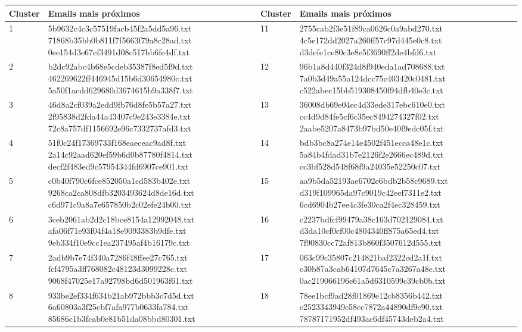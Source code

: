\documentclass[10pt,twocolumn,letterpaper]{article}
\begin{document}
\begin{table}
\begin{center}
\begin{tabular}{ | l | l || l | l | p{8cm} |}
\hline
Cluster & Emails mais próximos & Cluster & Emails mais próximos \\
\hline
1 & \parbox[c][1.5cm]{6cm}{5b9632c4c3c57519facb45f2a5dd5a96.txt 71868b35bb0b811f7f5663f79a8c28ad.txt 0ee154d3e67ef3491d08c517bb6fe4df.txt} & 11 & \parbox[c][1.5cm]{6cm}{2755cab2f3e51f89ca0626c0a9abd270.txt 4c5e172dd2027a260ff57c97d445e0c8.txt d3defe1ce80c3e8e5f3690ff2de4bfd6.txt} \\
2 & \parbox[c][1.5cm]{6cm}{b2dc92abc4b68e5cdeb35387f8ed5f9d.txt 462269622ff446945d15b6d30654980c.txt 5a50f1acdd629680d3674615b9a338f7.txt} & 12 & \parbox[c][1.5cm]{6cm}{96b1a8d440f324d8f940eda1ad708688.txt 7a0b3d49a55a124dcc75c403420c0481.txt c522abec15bb519308450f94dfb40e3c.txt} \\
3 & \parbox[c][1.5cm]{6cm}{46d8a2cf039a2edd9fb76d8fe5b57a27.txt 2f95838d2fda44a43407c9e243e3384e.txt 72c8a757df1156692e96c7332737afd3.txt} & 13 & \parbox[c][1.5cm]{6cm}{36008db69e04ec4d33ede317ebc610e0.txt cc4d9d84fe5cf6c35ec8494274327f02.txt 2aabe5207a8473b97bd50e40f9edc05f.txt} \\
4 & \parbox[c][1.5cm]{6cm}{51f0c24f17369733f168eaeceac9ad8f.txt 2a14c92aad620ef59b6d0b87780f4814.txt decf2f483ed9c57954344fd6907ce901.txt} & 14 & \parbox[c][1.5cm]{6cm}{bdb3bc8a274e14e4502f451ecca48e1c.txt 5a84b4fdad31b7e2126f2e2666ec489d.txt cc3bf528d548f68f9a24035e52250c07.txt} \\
5 & \parbox[c][1.5cm]{6cm}{c0b40f790c6fce852050a1cd583b402e.txt 9268ca2ca808dfb3203493624d8de16d.txt c6d971c9a8a7e657850b2c02efe24b00.txt} & 15 & \parbox[c][1.5cm]{6cm}{aa9b5da52193ae6702e6bdb2b58c9689.txt d319f109965da97c9019c42eef7311e2.txt 6cd6904b27ee4c3fe30ca2f4ec328459.txt} \\
6 & \parbox[c][1.5cm]{6cm}{3ceb2061ab2d2c18bce8154a12992048.txt afa06f71e93f04f4a18e9093383b9dfe.txt 9eb334f10e9cc1ea237495af4b16179c.txt} & 16 & \parbox[c][1.5cm]{6cm}{c2237bdfcf99479a38c163d702129084.txt d3da10cf0cf00c4804340ff875a65ed4.txt 7f90830cc72af813b860f3507612d555.txt} \\
7 & \parbox[c][1.5cm]{6cm}{2adb9b7e74f340a7286f48ffee27c765.txt fcf4795a3ff768082c48123d3099228c.txt 9068f47025e17a92798bd6d501963f61.txt} & 17 & \parbox[c][1.5cm]{6cm}{063c99c35807c214821baf2322cd2a1f.txt c30b87a3cab64107d7645c7a3267a48e.txt 0ac219066196e61a5d6310599c39cb0b.txt} \\
8 & \parbox[c][1.5cm]{6cm}{933be2ef334f634b21ab972bbb3c7d5d.txt 6a60803a3f25cbf7afa977b0633fa784.txt 85686c1b3fcab0e81b51da08bbd80301.txt} & 18 & \parbox[c][1.5cm]{6cm}{78ee1bcf9ad28f01869e12cb8356b442.txt c2523343949c58ec7872a44890df9e90.txt 78787171952df493ac6df45743deb2a4.txt} \\

\end{tabular}
\end{center}
\end{table}
\end{document}

